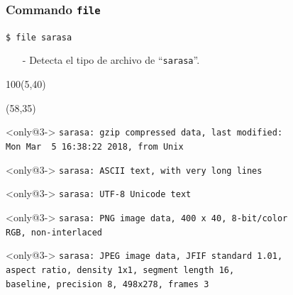 \documentclass{beamer}
\begin{document}
\begin{frame}[fragile,t]
    \frametitle{Commando \texttt{file}}
    \begin{block}{\vspace*{-3ex}}
    \texttt{\$}\verb: file sarasa:
    \vspace*{0.5ex}
    \end{block}
    \begin{itemize}
    \item[-] Detecta el tipo de archivo de ``\verb|sarasa|''.
    \end{itemize}
    \begin{textblock}{100}(5,40)
    \begin{center}
    \end{center}
    \end{textblock}
    \begin{textblock}{60}(58,35)
    \begin{block}<only@3->{\vspace*{-3ex}}
    \scriptsize
    \verb;sarasa: gzip compressed data, last modified:;\\
    \verb;Mon Mar  5 16:38:22 2018, from Unix;\\
    \end{block}\vspace{-0.5cm}
    \begin{block}<only@3->{\vspace*{-3ex}}
    \scriptsize
    \verb;sarasa: ASCII text, with very long lines;\\
    \end{block}\vspace{-0.5cm}
    \begin{block}<only@3->{\vspace*{-3ex}}
    \scriptsize
    \verb;sarasa: UTF-8 Unicode text;\\
    \end{block}\vspace{-0.5cm}
    \begin{block}<only@3->{\vspace*{-3ex}}
    \scriptsize
    \verb;sarasa: PNG image data, 400 x 40, 8-bit/color;\\
    \verb;RGB, non-interlaced;\\
    \end{block}\vspace{-0.5cm}
    \begin{block}<only@3->{\vspace*{-3ex}}
    \scriptsize
    \verb;sarasa: JPEG image data, JFIF standard 1.01,;\\
    \verb;aspect ratio, density 1x1, segment length 16,;\\
    \verb;baseline, precision 8, 498x278, frames 3;\\
    \vspace*{0.5ex}
    \end{block}
    \end{textblock}
\end{frame}
\end{document}
